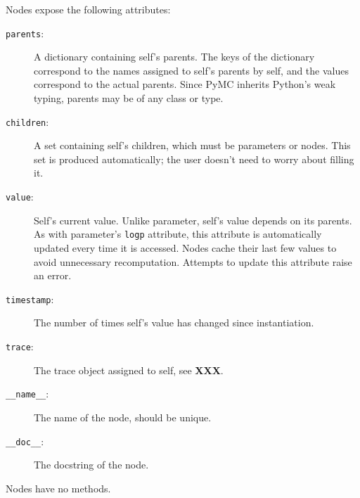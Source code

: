 \documentclass[]{book}
\begin{document}
Nodes expose the following attributes:
\begin{description}
    \item[\texttt{parents}:] A dictionary containing self's parents. The keys of the dictionary correspond to the names assigned to self's parents by self, and the values correspond to the actual parents. Since PyMC inherits Python's weak typing, parents may be of any class or type.
    \item[\texttt{children}:] A set containing self's children, which must be parameters or nodes. This set is produced automatically; the user doesn't need to worry about filling it.
    \item[\texttt{value}:] Self's current value. Unlike parameter, self's value depends on its parents. As with parameter's \texttt{logp} attribute, this attribute is automatically updated every time it is accessed. Nodes cache their last few values to avoid unnecessary recomputation. Attempts to update this attribute raise an error.
    \item[\texttt{timestamp}:] The number of times self's value has changed since instantiation.
    \item[\texttt{trace}:] The trace object assigned to self, see \textbf{XXX}.
    \item[\texttt{\_\_name\_\_}:] The name of the node, should be unique.
    \item[\texttt{\_\_doc\_\_}:] The docstring of the node.
\end{description}
Nodes have no methods.
\end{document}
